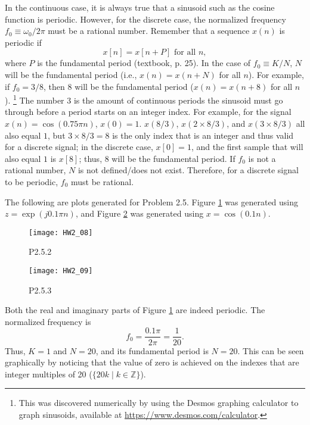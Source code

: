 \documentclass{article}
\begin{document}
In the continuous case, it is always true that a sinusoid such
as the cosine
function is periodic. However, for the discrete case, the
normalized frequency \(f_0 \equiv \omega_0 / 2\pi\) must be a
rational number.
Remember that a sequence \(x(n)\) is periodic if
\begin{equation} \label{periodic def}
    x[n] = x[n + P] \text{ for all } n,
\end{equation}
where \(P\) is the
fundamental period (textbook, p. 25). In the case of
\(f_0 \equiv K/N\), \(N\) will be the fundamental period
(i.e., \(x(n) = x(n + N)\) for all \(n\)).
For example, if \(f_0 = 3/8\), then \(8\) will be the
fundamental period (\(x(n) = x(n + 8)\) for all \(n\)).%
\footnote{This was discovered numerically by using
the Desmos graphing calculator to graph sinusoids,
available at \url{https://www.desmos.com/calculator}.}
The number 3 is the amount of continuous periods
the sinusoid must go through before a period starts on
an integer index. For example, for the signal
\(x(n) = \cos(0.75\pi n)\), \(x(0) = 1\).
\(x(8/3)\), \(x(2\times 8/3)\), and \(x(3\times 8/3)\) all also
equal \(1\), but \(3\times 8/3 = 8\) is the only index that
is an integer and thus valid for a discrete signal; in the
discrete case, \(x[0] = 1\), and the first sample that will
also equal \(1\) is \(x[8]\); thus, 8 will be the
fundamental period.
If \(f_0\) is not a
rational number, \(N\) is not defined/does not exist. Therefore,
for a discrete signal to be periodic, \(f_0\) must be rational.

The following are plots generated for Problem 2.5. Figure
\ref{P2.5.2} was generated using \(z = \exp(j 0.1 \pi n)\),
and Figure \ref{P2.5.3} was generated using \(x = \cos(0.1n)\).

\begin{figure}[H]
    \centering
    \texttt{[image: HW2\_08]}
    \caption{P2.5.2}
    \label{P2.5.2}
\end{figure}%
\begin{figure}[H]
    \centering
    \texttt{[image: HW2\_09]}
    \caption{P2.5.3}
    \label{P2.5.3}
\end{figure}

Both the real and imaginary parts of Figure \ref{P2.5.2} are
indeed periodic. The normalized frequency is
\begin{equation*}
    f_0 = \frac{0.1\pi}{2\pi} = \frac{1}{20}.
\end{equation*} Thus, \(K = 1\) and \(N = 20\), and its fundamental
period is \(N = 20\). This can be seen graphically by noticing
that the value of zero is achieved on the indexes that are
integer multiples of 20 (\(\{20k \mid k \in \mathbb{Z}\}\)).
\end{document}
